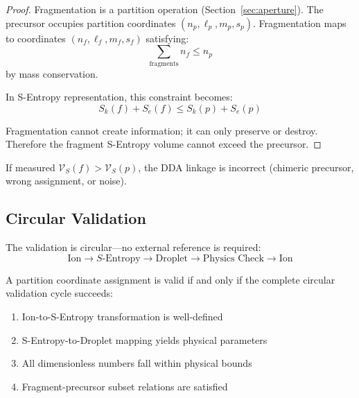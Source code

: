 \begin{proof}
Fragmentation is a partition operation (Section~\ref{sec:aperture}). The precursor occupies partition coordinates $(n_p, \ell_p, m_p, s_p)$. Fragmentation maps to coordinates $(n_f, \ell_f, m_f, s_f)$ satisfying:
\begin{equation}
    \sum_{\text{fragments}} n_f \leq n_p
\end{equation}
by mass conservation.

In S-Entropy representation, this constraint becomes:
\begin{equation}
    S_k(f) + S_e(f) \leq S_k(p) + S_e(p)
\end{equation}

Fragmentation cannot create information; it can only preserve or destroy. Therefore the fragment S-Entropy volume cannot exceed the precursor.
\end{proof}

\begin{corollary}
If measured $\mathcal{V}_S(f) > \mathcal{V}_S(p)$, the DDA linkage is incorrect (chimeric precursor, wrong assignment, or noise).
\end{corollary}

\subsection{Circular Validation}

The validation is circular---no external reference is required:
\begin{equation}
    \text{Ion} \to S\text{-Entropy} \to \text{Droplet} \to \text{Physics Check} \to \text{Ion}
\end{equation}

\begin{theorem}
A partition coordinate assignment is valid if and only if the complete circular validation cycle succeeds:
\begin{enumerate}
    \item Ion-to-S-Entropy transformation is well-defined
    \item S-Entropy-to-Droplet mapping yields physical parameters
    \item All dimensionless numbers fall within physical bounds
    \item Fragment-precursor subset relations are satisfied
\end{enumerate}
\end{theorem}

